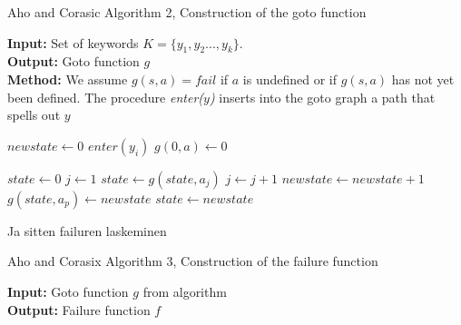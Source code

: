 \documentclass[english,twoside,censored,csm,algorithms-track-2020]{HYthesisML}
\theoremstyle{plain}
\theoremstyle{definition}
\begin{document}
\begin{lemma}[]
\begin{algorithm}
    \caption{Aho and Corasic Algorithm 2, Construction of the goto function} \label{ac-goto}
    \hspace*{\algorithmicindent} \textbf{Input:} Set of keywords $K = \{y_1,y_2...,y_k\}$.\\
    \hspace*{\algorithmicindent} \textbf{Output:} Goto function $g$\\
    \hspace*{\algorithmicindent} \textbf{Method:} We assume $g(s,a) = fail$ if $a$ is undefined or if $g(s,a)$ has not yet been defined. The procedure \textit{enter($y$)} inserts into the goto graph a path that spells out $y$
    
      \begin{algorithmic}[1]
          \State $newstate\gets 0$
            \State $enter(y_i)$
          \EndFor
            \State $g(0,a)\gets 0$
          \EndFor
        \EndFunction

          \State $state\gets 0$
          \State $j\gets 1$
            \State $state\gets g(state,a_j)$
            \State $j\gets j+1$
          \EndWhile
            \State $newstate\gets newstate+1$
            \State $g(state,a_p)\gets newstate$
            \State $state\gets newstate$
          \EndFor
        \EndFunction
      \end{algorithmic}
  \end{algorithm}

  Ja sitten failuren laskeminen

  \begin{algorithm}

    \caption{Aho and Corasix Algorithm 3, Construction of the failure function} \label{ac-fail}
    \hspace*{\algorithmicindent} \textbf{Input:} Goto function $g$ from algorithm\\ %
    \hspace*{\algorithmicindent} \textbf{Output:} Failure function $f$


\end{algorithm}
\end{lemma}
\end{document}
